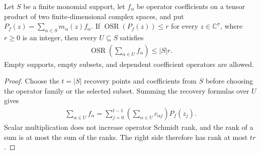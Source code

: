 \begin{theorem}
    \label{thm:monomial_evaluation_selected_rank}
    \leanok
    Let $S$ be a finite monomial support, let $f_\alpha$ be operator coefficients
    on a tensor product of two finite-dimensional complex spaces, and put
    $P_f(z)=\sum_{\alpha\in S}m_\alpha(z)f_\alpha$.
    If $\operatorname{OSR}(P_f(z))\le r$ for every $z\in\mathbb C^\sigma$,
    where $r\ge0$ is an integer, then every $U\subseteq S$ satisfies
    \begin{align*}
        \operatorname{OSR}\!\left(\sum_{\alpha\in U}f_\alpha\right)\le |S|r.
    \end{align*}
    Empty supports, empty subsets, and dependent coefficient operators are allowed.
\end{theorem}
\begin{proof}
    \leanok
    Choose the $t=|S|$ recovery points and coefficients from $S$ before
    choosing the operator family or the selected subset. Summing the recovery
    formulas over $U$ gives
    \begin{align*}
        \sum_{\alpha\in U}f_\alpha
        =\sum_{j=0}^{t-1}\left(\sum_{\alpha\in U}c_{\alpha j}\right)P_f(z_j).
    \end{align*}
    Scalar multiplication does not increase operator Schmidt rank, and the
    rank of a sum is at most the sum of the ranks. The right side therefore
    has rank at most $tr$.
\end{proof}

